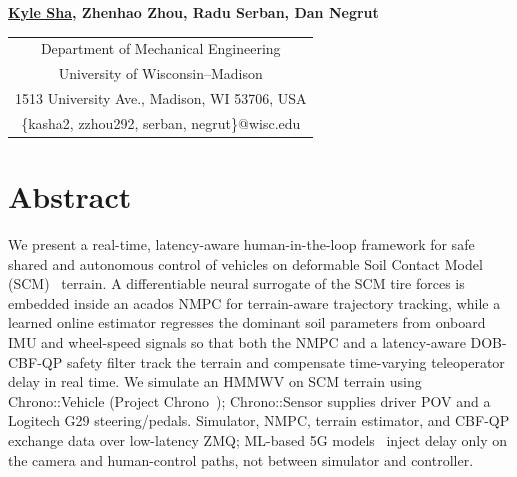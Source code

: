 \documentclass{acmd2026_abstract}
\begin{document}
\begin{center}
\end{center}
\vspace{-6pt}

\begin{center}
\normalsize{
  \bf{
    \underline{Kyle Sha},
    Zhenhao Zhou,
    Radu Serban,
    Dan Negrut}
}
\end{center}
\vspace{-6pt}

\begin{center}
  \begin{tabular}{c}
    Department of Mechanical Engineering             \\
    University of Wisconsin--Madison                 \\
    1513 University Ave., Madison, WI 53706, USA     \\
    \{kasha2, zzhou292, serban, negrut\}@wisc.edu    \\
  \end{tabular}
\end{center}
\vspace{-8pt}

\section*{Abstract}
We present a real-time, latency-aware human-in-the-loop framework
for safe shared and autonomous control of vehicles on deformable
Soil Contact Model (SCM)~\cite{Krenn09} terrain.  A differentiable
neural surrogate of the SCM tire forces is embedded inside an
acados NMPC for terrain-aware trajectory tracking, while a
learned online estimator regresses the dominant soil parameters
from onboard IMU and wheel-speed signals so that both the NMPC
and a latency-aware DOB-CBF-QP safety filter track the terrain and
compensate time-varying teleoperator delay in real time.  We simulate an HMMWV on
SCM terrain using Chrono::Vehicle (Project Chrono~\cite{Tasora16});
Chrono::Sensor supplies driver POV and a Logitech G29 steering/pedals.
Simulator, NMPC, terrain estimator, and CBF-QP exchange data over
low-latency ZMQ; ML-based 5G models~\cite{Choi23}
inject delay only on the camera and human-control paths, not between
simulator and controller.
\end{document}

